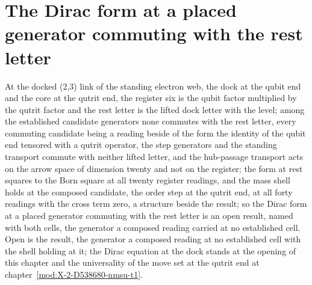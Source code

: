 \section{The Dirac form at a placed generator commuting with the rest letter}\label{mod:V-9-D538654-w-fcgd}
\begin{chwall}
At the docked (2,3) link of the standing electron web, the dock at the qubit end and the core at the qutrit end, the register six is the qubit factor multiplied by the qutrit factor and the rest letter is the lifted dock letter with the level; among the established candidate generators none commutes with the rest letter, every commuting candidate being a reading beside of the form the identity of the qubit end tensored with a qutrit operator, the step generators and the standing transport commute with neither lifted letter, and the hub-passage transport acts on the arrow space of dimension twenty and not on the register; the form at rest squares to the Born square at all twenty register readings, and the mass shell holds at the composed candidate, the order step at the qutrit end, at all forty readings with the cross term zero, a structure beside the result; so the Dirac form at a placed generator commuting with the rest letter is an open result, named with both cells, the generator a composed reading carried at no established cell.
Open is the result, the generator a composed reading at no established cell with the shell holding at it; the Dirac equation at the dock stands at the opening of this chapter and the universality of the move set at the qutrit end at chapter~\ref{mod:X-2-D538680-nmsu-t1}.
\end{chwall}
\chdeps{}{}
